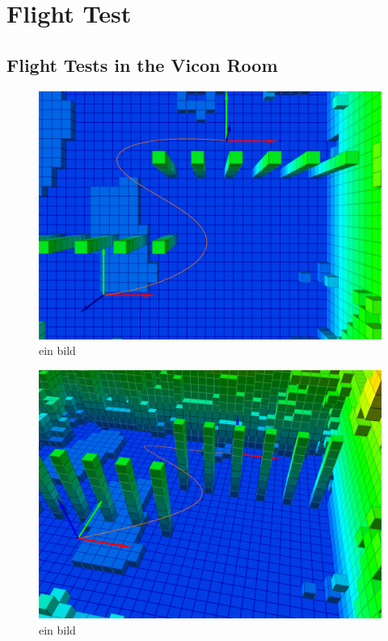 \chapter{Flight Test}\label{chap:Flight}


\section{Flight Tests in the Vicon Room}



\begin{figure}[H]
   \centering
   \includegraphics[trim = 0mm 0mm 0mm 0mm,clip,width=1\textwidth]{pics/2c.png}
   \caption{ein bild}
   \label{pic:testdfgd}
\end{figure}




\begin{figure}[H]
   \centering
   \includegraphics[trim = 0mm 0mm 0mm 0mm,clip,width=1\textwidth]{pics/2a.png}
   \caption{ein bild}
   \label{pic:testsfsfsdf}
\end{figure}




